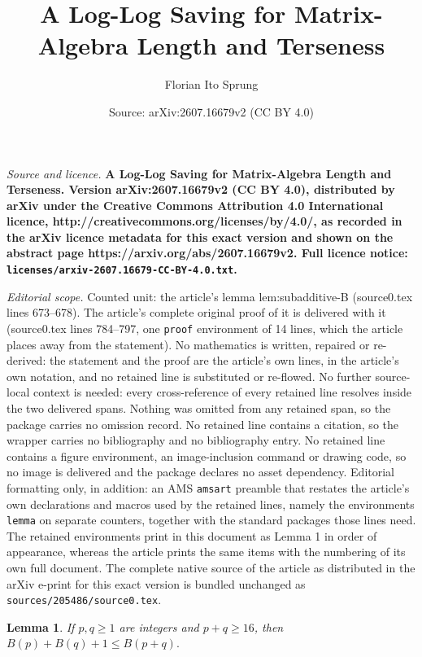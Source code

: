 \documentclass[10pt,a4paper]{amsart}
\title{\bfseries A Log-Log Saving for Matrix-Algebra Length and Terseness}
\author{Florian Ito Sprung}
\date{Source: arXiv:2607.16679v2 (CC BY 4.0)}
\newtheorem{lemma}{Lemma}
\renewcommand{\geq}{\geqslant}
\renewcommand{\leq}{\leqslant}
\begin{document}
\maketitle

\noindent\emph{Source and licence.} \bfseries A Log-Log Saving for Matrix-Algebra Length and Terseness. Version arXiv:2607.16679v2 (CC BY 4.0), distributed by arXiv under the Creative Commons Attribution 4.0 International licence, http://creativecommons.org/licenses/by/4.0/, as recorded in the arXiv licence metadata for this exact version and shown on the abstract page https://arxiv.org/abs/2607.16679v2. Full licence notice: \texttt{licenses/arxiv-2607.16679-CC-BY-4.0.txt}.\par\smallskip

\noindent\textit{Editorial scope.} Counted unit: the article's lemma lem:subadditive-B (source0.tex lines 673--678). The article's complete original proof of it is delivered with it (source0.tex lines 784--797, one \texttt{proof} environment of 14 lines, which the article places away from the statement). No mathematics is written, repaired or re-derived: the statement and the proof are the article's own lines, in the article's own notation, and no retained line is substituted or re-flowed.  No further source-local context is needed: every cross-reference of every retained line resolves inside the two delivered spans.  Nothing was omitted from any retained span, so the package carries no omission record.  No retained line contains a citation, so the wrapper carries no bibliography and no bibliography entry.  No retained line contains a figure environment, an image-inclusion command or drawing code, so no image is delivered and the package declares no asset dependency.  Editorial formatting only, in addition: an AMS \texttt{amsart} preamble that restates the article's own declarations and macros used by the retained lines, namely the environments \texttt{lemma} on separate counters, together with the standard packages those lines need.  The retained environments print in this document as Lemma 1 in order of appearance, whereas the article prints the same items with the numbering of its own full document.  The complete native source of the article as distributed in the arXiv e-print for this exact version is bundled unchanged as \texttt{sources/205486/source0.tex}.
\begin{lemma}
\label{lem:subadditive-B}
If $p,q\geq 1$ are integers and $p+q\geq 16$, then $ B(p)+B(q)+1\leq B(p+q).
$

\end{lemma}
\end{document}
